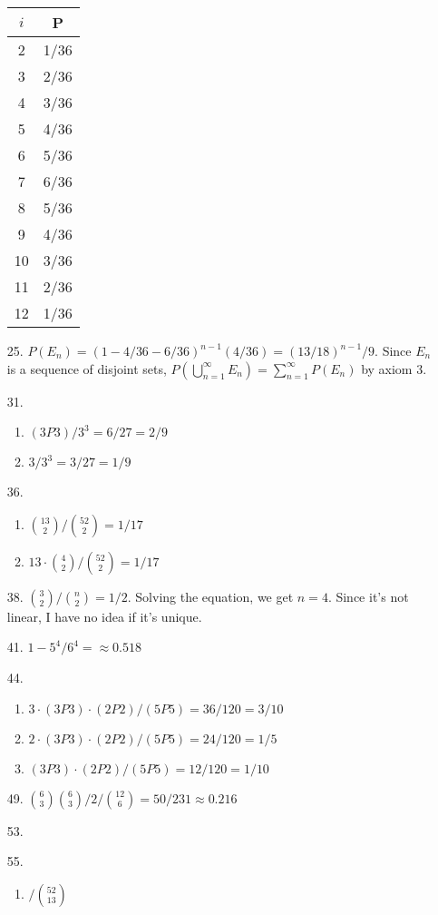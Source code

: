 \documentclass{article}
\begin{document}
\begin{itemize}
\begin{tabular}{c | c}
    $i$ & P \\
    \hline
    2 & 1/36 \\
    3 & 2/36 \\
    4 & 3/36 \\
    5 & 4/36 \\
    6 & 5/36 \\
    7 & 6/36 \\
    8 & 5/36 \\
    9 & 4/36 \\
    10 & 3/36 \\
    11 & 2/36 \\
    12 & 1/36
  \end{tabular}
\item [25.]
  $P(E_n)= (1-4/36-6/36)^{n-1}(4/36) = (13/18)^{n-1}/9$.
  Since $E_n$ is a sequence of disjoint sets,
  $P(\bigcup_{n=1}^{\infty}E_n)=\sum_{n=1}^{\infty}P(E_n)$ by axiom 3.
\item [31.]
  \begin{enumerate}[label=(\alph*)]
  \item $(3P3)/3^3=6/27=2/9$
  \item $3/3^3=3/27=1/9$
  \end{enumerate}
\item [36.]
  \begin{enumerate}[label=(\alph*)]
  \item ${13 \choose 2}/{52 \choose 2} = 1/17$
  \item $13 \cdot {4 \choose 2} / {52 \choose 2} = 1/17$
  \end{enumerate}
\item [38.]
  ${3 \choose 2}/{n \choose 2} = 1/2$. Solving the equation, we get
  $n=4$. Since it's not linear, I have no idea if it's unique.
\item [41.]
  $1-5^4/6^4=\approx 0.518$
\item [44.]
  \begin{enumerate}[label=(\alph*)]
  \item $3\cdot(3P3)\cdot(2P2)/(5P5) = 36/120 = 3/10$
  \item $2\cdot(3P3)\cdot(2P2)/(5P5) = 24/120 = 1/5$
  \item $(3P3)\cdot(2P2)/(5P5) = 12/120=1/10$
  \end{enumerate}
\item [49.]
  ${6 \choose 3}{6 \choose 3}/2/{12 \choose 6} = 50/231 \approx 0.216$
\item [53.]
  
\item [55.]
  \begin{enumerate}[label=(\alph*)]
  \item $/{52 \choose 13}$
  \end{enumerate}


\end{itemize}
\end{document}
